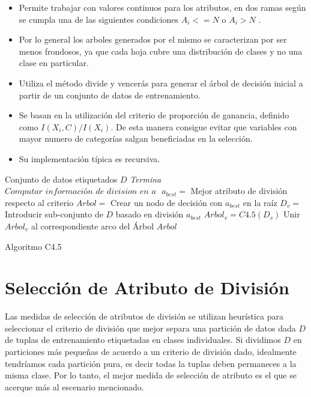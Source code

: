 \begin{itemize}
	\item Permite trabajar con valores continuos para los atributos, en dos ramas según se cumpla una de las siguientes condiciones  $ A_{i} <= N $ o $ A_{i} > N $ . 
	\item Por lo general los arboles generados por el mismo se caracterizan por ser menos frondosos, ya que cada hoja cubre una distribución de clases y no una clase en particular.
	\item Utiliza el método divide y vencerás para generar el árbol de decisión inicial a partir de un conjunto de datos de entrenamiento.
	\item Se basan en la utilización del criterio de proporción de ganancia, definido como $ I(X_{i},C) / I(X_{i})  $. De esta manera consigue evitar que variables con mayor numero de categorías salgan beneficiadas en la selección. 
	\item Su implementación típica es recursiva.
\end{itemize}

\begin{algorithm}
	\begin{algorithmic}[1]
		\Require Conjunto de datos etiquetados $D$
				\State\textit{Termina}
			\EndIf
				\State $\textit{Computar información de division en a }$
			\EndFor
			\State $ a_{best} =$ Mejor atributo de división respecto al criterio 
			\State $ Arbol =$ Crear un nodo de decisión con $ a_{best} $ en la raíz 
			\State $ D_{v} =$ Introducir sub-conjunto de $D$ basado en división $ a_{best} $
				\State $ Arbol_{v} = C4.5(D_{v}) $
				\State Unir $ Arbol_{v} $ al correspondiente arco del Árbol
			\EndFor
			\State 
			\Return $ Arbol $
		\EndProcedure
	\end{algorithmic}
	\caption{\label{algoC45}Algoritmo C4.5}
\end{algorithm}


\section{Selección de Atributo de División}
Las medidas de selección de atributos de división se utilizan heurística para seleccionar el criterio de división que mejor separa una partición de datos dada $D$ de tuplas de entrenamiento etiquetadas en clases individuales. Si dividimos $D$ en particiones más pequeñas de acuerdo a un criterio de división dado, idealmente tendríamos cada partición pura, es decir todas la tuplas deben permaneces a la misma clase. Por lo tanto, el mejor medida de selección de atributo es el que se acerque más al escenario mencionado.

